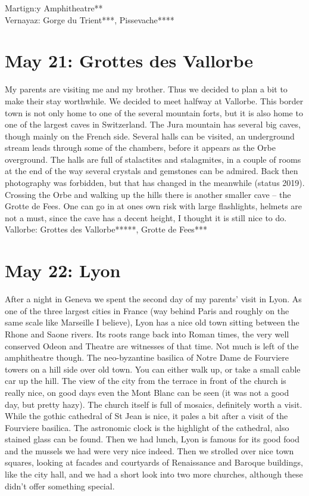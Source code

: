 Martign:y Amphitheatre**\\
Vernayaz: Gorge du Trient***, Pissevache****

\section{May 21: Grottes des Vallorbe}
\label{Vallorbe2011}

My parents are visiting me and my brother. Thus we decided to plan a bit to make their stay worthwhile. We decided to meet halfway at Vallorbe. This border town is not only home to one of the several mountain forts, but it is also home to one of the largest caves in Switzerland. The Jura mountain has several big caves, though mainly on the French side. Several halls can be visited, an underground stream leads through some of the chambers, before it appears as the Orbe overground. The halls are full of stalactites and stalagmites, in a couple of rooms at the end of the way several crystals and gemstones can be admired. Back then photography was forbidden, but that has changed in the meanwhile (status 2019). Crossing the Orbe and walking up the hills there is another smaller cave -- the Grotte de Fees. One can go in at ones own risk with large flashlights, helmets are not a must, since the cave has a decent height, I thought it is still nice to do.\\

Vallorbe: Grottes des Vallorbe*****, Grotte de Fees***

\section{May 22: Lyon}
\label{Lyon2011}

After a night in Geneva we spent the second day of my parents' visit in Lyon. As one of the three largest cities in France (way behind Paris and roughly on the same scale like Marseille I believe), Lyon has a nice old town sitting between the Rhone and Saone rivers. Its roots range back into Roman times, the very well conserved Odeon and Theatre are witnesses of that time. Not much is left of the amphitheatre though. The neo-byzantine basilica of Notre Dame de Fourviere towers on a hill side over old town. You can either walk up, or take a small cable car up the hill. The view of the city from the terrace in front of the church is really nice, on good days even the Mont Blanc can be seen (it was not a good day, but pretty hazy). The church itself is full of mosaics, definitely worth a visit. While the gothic cathedral of St Jean is nice, it pales a bit after a visit of the Fourviere basilica. The astronomic clock is the highlight of the cathedral, also stained glass can be found. Then we had lunch, Lyon is famous for its good food and the mussels we had were very nice indeed. Then we strolled over nice town squares, looking at facades and courtyards of Renaissance and Baroque buildings, like the city hall, and we had a short look into two more churches, although these didn't offer something special.\\

